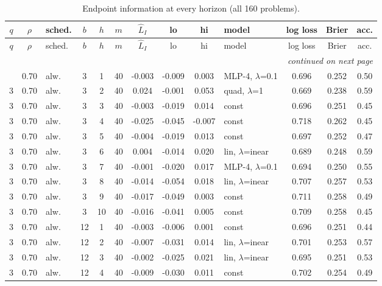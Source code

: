 \begin{scriptsize}
\setlength{\tabcolsep}{3pt}
\begin{longtable}{cclcc c ccc l ccc}
\caption{Endpoint information at every horizon (all 160 problems).}\label{tab:app-endpoint}\\
\toprule
$q$ & $\rho$ & sched. & $b$ & $h$ & $m$ & $\widehat L_I$ & lo & hi & model & log loss & Brier & acc. \\
\midrule
\endfirsthead
\toprule
$q$ & $\rho$ & sched. & $b$ & $h$ & $m$ & $\widehat L_I$ & lo & hi & model & log loss & Brier & acc. \\
\midrule
\endhead
\midrule
\multicolumn{13}{r}{\emph{continued on next page}}\\
\endfoot
\bottomrule
\endlastfoot
3 & 0.70 & alw. & 3 & 1 & 40 & -0.003 & -0.009 & 0.003 & MLP-4, $\lambda$=0.1 & 0.696 & 0.252 & 0.50 \\
3 & 0.70 & alw. & 3 & 2 & 40 & 0.024 & -0.001 & 0.053 & quad, $\lambda$=1 & 0.669 & 0.238 & 0.59 \\
3 & 0.70 & alw. & 3 & 3 & 40 & -0.003 & -0.019 & 0.014 & const & 0.696 & 0.251 & 0.45 \\
3 & 0.70 & alw. & 3 & 4 & 40 & -0.025 & -0.045 & -0.007 & const & 0.718 & 0.262 & 0.45 \\
3 & 0.70 & alw. & 3 & 5 & 40 & -0.004 & -0.019 & 0.013 & const & 0.697 & 0.252 & 0.47 \\
3 & 0.70 & alw. & 3 & 6 & 40 & 0.004 & -0.014 & 0.020 & lin, $\lambda$=inear & 0.689 & 0.248 & 0.59 \\
3 & 0.70 & alw. & 3 & 7 & 40 & -0.001 & -0.020 & 0.017 & MLP-4, $\lambda$=0.1 & 0.694 & 0.250 & 0.55 \\
3 & 0.70 & alw. & 3 & 8 & 40 & -0.014 & -0.054 & 0.018 & lin, $\lambda$=inear & 0.707 & 0.257 & 0.53 \\
3 & 0.70 & alw. & 3 & 9 & 40 & -0.017 & -0.049 & 0.003 & const & 0.711 & 0.258 & 0.49 \\
3 & 0.70 & alw. & 3 & 10 & 40 & -0.016 & -0.041 & 0.005 & const & 0.709 & 0.258 & 0.45 \\
3 & 0.70 & alw. & 12 & 1 & 40 & -0.003 & -0.006 & 0.001 & const & 0.696 & 0.251 & 0.44 \\
3 & 0.70 & alw. & 12 & 2 & 40 & -0.007 & -0.031 & 0.014 & lin, $\lambda$=inear & 0.701 & 0.253 & 0.57 \\
3 & 0.70 & alw. & 12 & 3 & 40 & -0.002 & -0.025 & 0.021 & lin, $\lambda$=inear & 0.695 & 0.251 & 0.53 \\
3 & 0.70 & alw. & 12 & 4 & 40 & -0.009 & -0.030 & 0.011 & const & 0.702 & 0.254 & 0.49 \\

\end{longtable}
\end{scriptsize}
